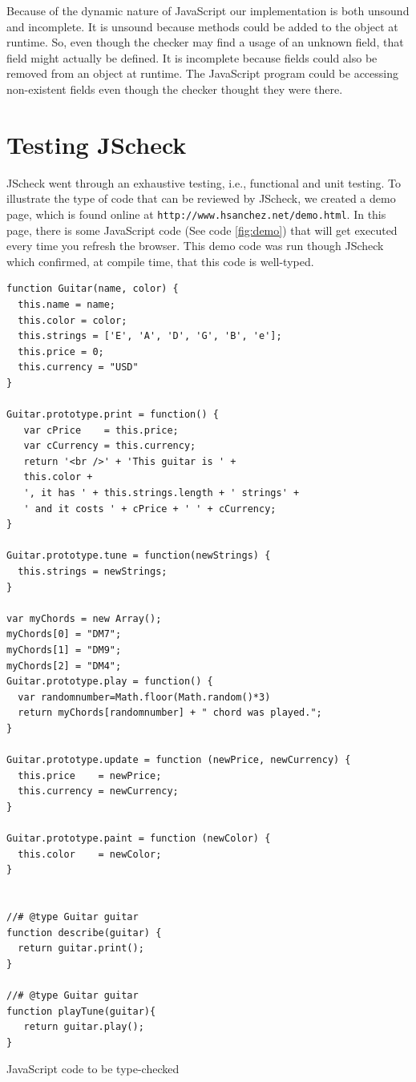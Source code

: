 \documentclass{article}
\begin{document}
Because of the dynamic nature of JavaScript our implementation is both unsound 
and incomplete. It is unsound because methods could be added to the object at
runtime. So, even though the checker may find a usage of an unknown field, that field
might actually be defined. It is incomplete because fields could also be removed
from an object at runtime. The JavaScript program could be accessing non-existent 
fields even though the checker thought they were there.


\section{Testing JScheck}
\label{sec:testing}

JScheck went through an exhaustive testing, i.e., functional and unit testing. 
To illustrate the type of code that can be reviewed by JScheck, we created a demo 
page, which is found online at {\tt http://www.hsanchez.net/demo.html}. In this page, 
there is some JavaScript code (See code \ref{fig:demo}) that will get executed every 
time you refresh the browser. This demo code was run though JScheck which confirmed, 
at compile time, that this code is well-typed.

\begin{program}
\begin{verbatim}
function Guitar(name, color) {
  this.name = name;
  this.color = color;
  this.strings = ['E', 'A', 'D', 'G', 'B', 'e'];
  this.price = 0;
  this.currency = "USD"
}

Guitar.prototype.print = function() {
   var cPrice    = this.price;
   var cCurrency = this.currency;  
   return '<br />' + 'This guitar is ' +
   this.color +
   ', it has ' + this.strings.length + ' strings' +
   ' and it costs ' + cPrice + ' ' + cCurrency;
}

Guitar.prototype.tune = function(newStrings) {
  this.strings = newStrings;
}

var myChords = new Array();
myChords[0] = "DM7";
myChords[1] = "DM9";
myChords[2] = "DM4"; 
Guitar.prototype.play = function() {
  var randomnumber=Math.floor(Math.random()*3)
  return myChords[randomnumber] + " chord was played.";
}
 
Guitar.prototype.update = function (newPrice, newCurrency) {
  this.price    = newPrice;
  this.currency = newCurrency;
}

Guitar.prototype.paint = function (newColor) {
  this.color    = newColor;
}


//# @type Guitar guitar
function describe(guitar) {
  return guitar.print();
}
 
//# @type Guitar guitar
function playTune(guitar){
   return guitar.play();   
}
\end{verbatim}
\caption{JavaScript code to be type-checked}
\label{fig:demo}
\end{program}
\pagebreak
\end{document}
